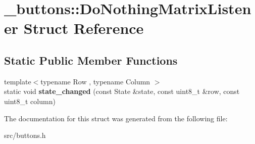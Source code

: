 \hypertarget{struct__buttons_1_1DoNothingMatrixListener}{}\section{\+\_\+buttons\+:\+:Do\+Nothing\+Matrix\+Listener Struct Reference}
\label{struct__buttons_1_1DoNothingMatrixListener}
\subsection*{Static Public Member Functions}
\begin{DoxyCompactItemize}
\item 
\hypertarget{struct__buttons_1_1DoNothingMatrixListener_a52d7045abc7a2774b0fac5f18082e936}{}\label{struct__buttons_1_1DoNothingMatrixListener_a52d7045abc7a2774b0fac5f18082e936} 
{\footnotesize template$<$typename Row , typename Column $>$ }\\static void {\bfseries state\+\_\+changed} (const State \&state, const uint8\+\_\+t \&row, const uint8\+\_\+t column)
\end{DoxyCompactItemize}


The documentation for this struct was generated from the following file\+:\begin{DoxyCompactItemize}
\item 
src/buttons.\+h\end{DoxyCompactItemize}
